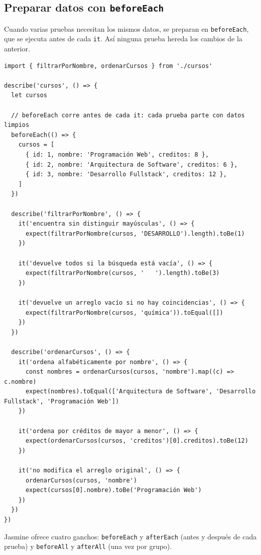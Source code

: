 \documentclass[11pt,a4paper]{article}
\newcommand{\cmd}[1]{\texttt{\color{reactdark}#1}}
\begin{document}
\subsection{Preparar datos con \texttt{beforeEach}}

Cuando varias pruebas necesitan los mismos datos, se preparan en \cmd{beforeEach}, que se ejecuta antes de cada \cmd{it}. Así ninguna prueba hereda los cambios de la anterior.

\begin{lstlisting}[language=JSX,title={\small\ttfamily src/logica/cursos.spec.js}]
import { filtrarPorNombre, ordenarCursos } from './cursos'

describe('cursos', () => {
  let cursos

  // beforeEach corre antes de cada it: cada prueba parte con datos limpios
  beforeEach(() => {
    cursos = [
      { id: 1, nombre: 'Programación Web', creditos: 8 },
      { id: 2, nombre: 'Arquitectura de Software', creditos: 6 },
      { id: 3, nombre: 'Desarrollo Fullstack', creditos: 12 },
    ]
  })

  describe('filtrarPorNombre', () => {
    it('encuentra sin distinguir mayúsculas', () => {
      expect(filtrarPorNombre(cursos, 'DESARROLLO').length).toBe(1)
    })

    it('devuelve todos si la búsqueda está vacía', () => {
      expect(filtrarPorNombre(cursos, '   ').length).toBe(3)
    })

    it('devuelve un arreglo vacío si no hay coincidencias', () => {
      expect(filtrarPorNombre(cursos, 'química')).toEqual([])
    })
  })

  describe('ordenarCursos', () => {
    it('ordena alfabéticamente por nombre', () => {
      const nombres = ordenarCursos(cursos, 'nombre').map((c) => c.nombre)
      expect(nombres).toEqual(['Arquitectura de Software', 'Desarrollo Fullstack', 'Programación Web'])
    })

    it('ordena por créditos de mayor a menor', () => {
      expect(ordenarCursos(cursos, 'creditos')[0].creditos).toBe(12)
    })

    it('no modifica el arreglo original', () => {
      ordenarCursos(cursos, 'nombre')
      expect(cursos[0].nombre).toBe('Programación Web')
    })
  })
})
\end{lstlisting}

Jasmine ofrece cuatro ganchos: \cmd{beforeEach} y \cmd{afterEach} (antes y después de cada prueba) y \cmd{beforeAll} y \cmd{afterAll} (una vez por grupo).
\end{document}

